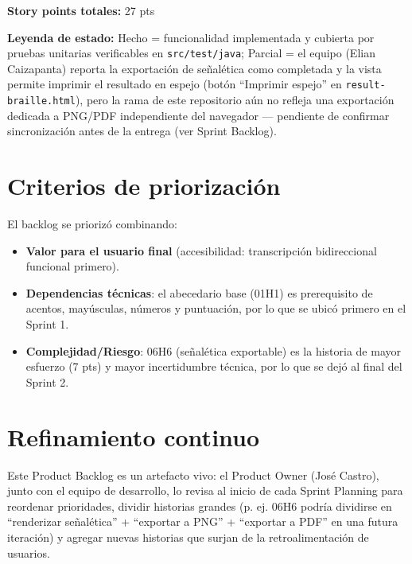 \documentclass[11pt]{article}
\begin{document}
\vspace{0.3cm}
\noindent\textbf{Story points totales:} 27 pts

\noindent\textbf{Leyenda de estado:} \colorbox{green!25}{Hecho} = funcionalidad implementada y cubierta por pruebas unitarias
verificables en \texttt{src/test/java}; \colorbox{yellow!40}{Parcial} = el equipo (Elian Caizapanta) reporta
la exportación de señalética como completada y la vista permite imprimir el resultado en espejo
(botón ``Imprimir espejo'' en \texttt{result-braille.html}), pero la rama de este repositorio aún no
refleja una exportación dedicada a PNG/PDF independiente del navegador --- pendiente de confirmar
sincronización antes de la entrega (ver Sprint Backlog).

\section{Criterios de priorización}
El backlog se priorizó combinando:
\begin{itemize}[leftmargin=1.4cm]
  \item \textbf{Valor para el usuario final} (accesibilidad: transcripción bidireccional funcional primero).
  \item \textbf{Dependencias técnicas}: el abecedario base (01H1) es prerequisito de acentos, mayúsculas,
        números y puntuación, por lo que se ubicó primero en el Sprint 1.
  \item \textbf{Complejidad/Riesgo}: 06H6 (señalética exportable) es la historia de mayor esfuerzo (7 pts)
        y mayor incertidumbre técnica, por lo que se dejó al final del Sprint 2.
\end{itemize}

\section{Refinamiento continuo}
Este Product Backlog es un artefacto vivo: el Product Owner (José Castro), junto con el equipo de desarrollo,
lo revisa al inicio de cada Sprint Planning para reordenar prioridades, dividir historias grandes
(p. ej. 06H6 podría dividirse en ``renderizar señalética'' + ``exportar a PNG'' + ``exportar a PDF''
en una futura iteración) y agregar nuevas historias que surjan de la retroalimentación de usuarios.
\end{document}
